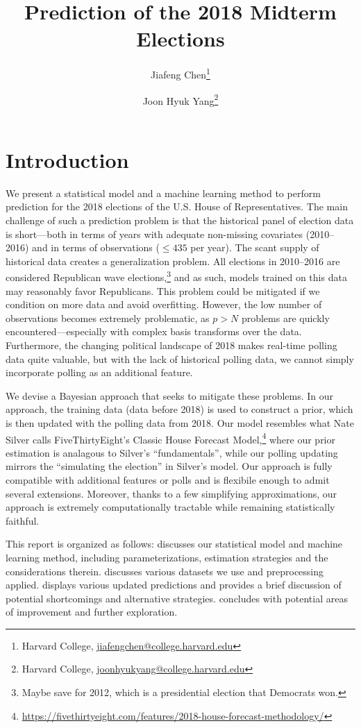 \documentclass[12pt, letterpaper]{article}
\title{\sffamily\bfseries{Prediction of the 2018 Midterm Elections}}
\author{Jiafeng Chen\thanks{Harvard College, \url{jiafengchen@college.harvard.edu}} \and Joon Hyuk Yang\thanks{Harvard College, \url{joonhyukyang@college.harvard.edu}}}
\begin{document}
\maketitle
\section{Introduction}

We present a statistical model and a machine learning method to perform
prediction for the 2018 elections of the U.S. House of Representatives. The main
challenge of such a prediction problem is that the historical panel of election
data is short---both in terms of years with adequate non-missing covariates
(2010--2016) and in terms of observations ($\le 435$ per year). The scant supply of historical data creates a generalization problem. All elections in 2010--2016 are
considered Republican wave elections,\footnote{Maybe save for 2012, which is a presidential election that Democrats won.} and as such, models trained on this data may reasonably favor Republicans. This problem could be mitigated if we condition on more data and avoid overfitting. However, the low number of observations becomes
extremely problematic, as $p > N$ problems are quickly encountered---especially
with complex basis transforms over the data. Furthermore, the changing political
landscape of 2018 makes real-time polling data quite valuable, but with the lack
of historical polling data, we cannot simply incorporate polling as an
additional feature.

We devise a Bayesian approach that seeks to mitigate these problems. In our
approach, the training data (data before 2018) is used to construct a prior, which is then updated with the polling data from 2018. Our model resembles what Nate Silver calls FiveThirtyEight's Classic House Forecast Model,\footnote{\url{https://fivethirtyeight.com/features/2018-house-forecast-methodology/}} 
where our prior estimation is analagous to Silver's ``fundamentals'', while our
polling updating mirrors the ``simulating the election'' in Silver's model. Our approach is fully
compatible with additional features or polls and is flexibile enough to admit several extensions.
Moreover, thanks to a few simplifying approximations, our approach is
extremely computationally tractable while remaining statistically faithful. 

This report is organized as follows:  discusses our statistical
model and machine learning method, including parameterizations, estimation
strategies and the considerations therein.  discusses various datasets
we use and preprocessing applied.  displays various
updated predictions and provides a brief discussion of potential shortcomings
and alternative strategies.  concludes with potential areas of improvement and further exploration.
\end{document}
